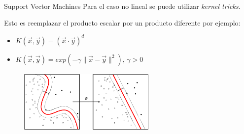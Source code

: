\documentclass[11pt]{beamer}
\begin{document}
\begin{frame}{Support Vector Machines}
Para el caso no lineal se puede utilizar \textit{kernel tricks}.

Esto es reemplazar el producto escalar por un producto diferente por ejemplo:
\begin{itemize}
    \item $K(\vec{x}, \vec{y}) = (\vec{x} \cdot \vec{y})^d$
    \item $K(\vec{x}, \vec{y}) = exp(-\gamma \|\vec{x} - \vec{y}\|^2)$, $\gamma>0$
\end{itemize}
\begin{figure}
    \centering
    \includegraphics[width=0.6\textwidth]{images/Kernel_MachineSVM.png}
\end{figure}
\end{frame}
\end{document}
